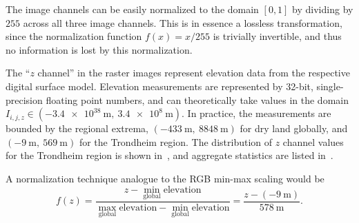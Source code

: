The image channels can be easily normalized to the domain $[0, 1]$ by dividing by $255$ across all three image channels.
This is in essence a lossless transformation, since the normalization function $f(x) = x/255$ is trivially invertible, and thus no information is lost by this normalization.


The \enquote{$z$ channel} in the raster images represent elevation data from the respective digital surface model.
Elevation measurements are represented by 32-bit, single-precision floating point numbers, and can theoretically take values in the domain $I_{i,j,z} \in (\SI{-3.4e38}{\meter},~\SI{3.4e8}{\meter})$.
In practice, the measurements are bounded by the regional extrema, $(\SI{-433}{\meter},~\SI{8848}{\meter})$ for dry land globally, and $(\SI{-9}{\meter},~\SI{569}{\meter})$ for the Trondheim region.
The distribution of $z$ channel values for the Trondheim region is shown in~, and aggregate statistics are listed in~.

\begin{figure}[htb]
  \begin{floatrow}
  \end{floatrow}
\end{figure}

A normalization technique analogue to the RGB min-max scaling would be
\begin{equation*}
  f(z)
  =
  \frac{
    z - \underset{\mathrm{global}}{\min} \text{elevation}
  }{
    \underset{\mathrm{global}}{\max} \text{elevation} - \underset{\mathrm{global}}{\min} \text{elevation}
  }
  =
  \frac{
    z - (\SI{-9}{\meter})
  }{
    \SI{578}{\meter}
  }.
\end{equation*}

